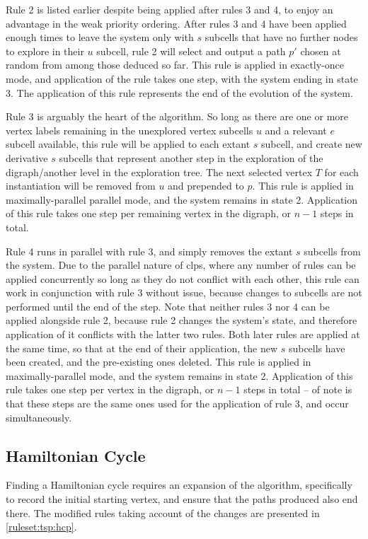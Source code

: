 Rule 2 is listed earlier despite being applied after rules 3 and 4, to enjoy an advantage in the weak priority ordering.  After rules 3 and 4 have been applied enough times to leave the system only with \(s\) subcells that have no further nodes to explore in their \(u\) subcell, rule 2 will select and output a path \(p'\) chosen at random from among those deduced so far.  This rule is applied in exactly-once mode, and application of the rule takes one step, with the system ending in state 3.  The application of this rule represents the end of the evolution of the system.

Rule 3 is arguably the heart of the algorithm.  So long as there are one or more vertex labels remaining in the unexplored vertex subcells \(u\) and a relevant \(e\) subcell available, this rule will be applied to each extant \(s\) subcell, and create new derivative \(s\) subcells that represent another step in the exploration of the digraph/another level in the exploration tree.  The next selected vertex \(T\) for each instantiation will be removed from \(u\) and prepended to \(p\).  This rule is applied in maximally-parallel parallel mode, and the system remains in state 2.  Application of this rule takes one step per remaining vertex in the digraph, or \(n - 1\) steps in total.

Rule 4 runs in parallel with rule 3, and simply removes the extant \(s\) subcells from the system.  Due to the parallel nature of \gls{clps}, where any number of rules can be applied concurrently so long as they do not conflict with each other, this rule can work in conjunction with rule 3 without issue, because changes to subcells are not performed until the end of the step.  Note that neither rules 3 nor 4 can be applied alongside rule 2, because rule 2 changes the system's state, and therefore application of it conflicts with the latter two rules.  Both later rules are applied at the same time, so that at the end of their application, the new \(s\) subcells have been created, and the pre-existing ones deleted.  This rule is applied in maximally-parallel mode, and the system remains in state 2.  Application of this rule takes one step per vertex in the digraph, or \(n - 1\) steps in total -- of note is that these steps are the same ones used for the application of rule 3, and occur simultaneously.

\subsection{Hamiltonian Cycle}
Finding a Hamiltonian cycle requires an expansion of the algorithm, specifically to record the initial starting vertex, and ensure that the paths produced also end there.  The modified rules taking account of the changes are presented in \cref{ruleset:tsp:hcp}.

